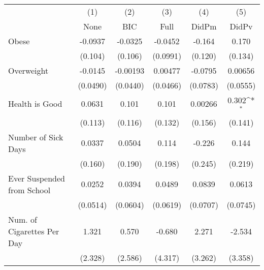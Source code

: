 {
\def\sym#1{\ifmmode^{#1}\else\(^{#1}\)\fi}
\begin{tabular}{l*{5}{c}}
\toprule
            &\multicolumn{1}{c}{(1)}&\multicolumn{1}{c}{(2)}&\multicolumn{1}{c}{(3)}&\multicolumn{1}{c}{(4)}&\multicolumn{1}{c}{(5)}\\
            &\multicolumn{1}{c}{None}&\multicolumn{1}{c}{BIC}&\multicolumn{1}{c}{Full}&\multicolumn{1}{c}{DidPm}&\multicolumn{1}{c}{DidPv}\\
\midrule
Obese       &     -0.0937         &     -0.0325         &     -0.0452         &      -0.164         &       0.170         \\
            &     (0.104)         &     (0.106)         &    (0.0991)         &     (0.120)         &     (0.134)         \\
\addlinespace
Overweight  &     -0.0145         &    -0.00193         &     0.00477         &     -0.0795         &     0.00656         \\
            &    (0.0490)         &    (0.0440)         &    (0.0466)         &    (0.0783)         &    (0.0555)         \\
\addlinespace
Health is Good&      0.0631         &       0.101         &       0.101         &     0.00266         &       0.302\sym{*}  \\
            &     (0.113)         &     (0.116)         &     (0.132)         &     (0.156)         &     (0.141)         \\
\addlinespace
Number of Sick Days&      0.0337         &      0.0504         &       0.114         &      -0.226         &       0.144         \\
            &     (0.160)         &     (0.190)         &     (0.198)         &     (0.245)         &     (0.219)         \\
\addlinespace
Ever Suspended from School&      0.0252         &      0.0394         &      0.0489         &      0.0839         &      0.0613         \\
            &    (0.0514)         &    (0.0604)         &    (0.0619)         &    (0.0707)         &    (0.0745)         \\
\addlinespace
Num. of Cigarettes Per Day&       1.321         &       0.570         &      -0.680         &       2.271         &      -2.534         \\
            &     (2.328)         &     (2.586)         &     (4.317)         &     (3.262)         &     (3.358)         \\
\bottomrule
\end{tabular}
}
